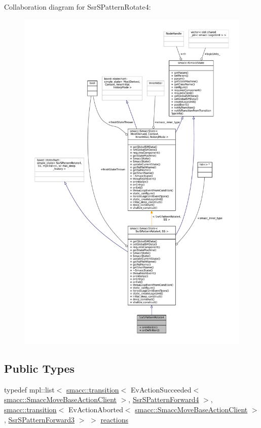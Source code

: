Collaboration diagram for Ssr\+S\+Pattern\+Rotate4\+:
\nopagebreak
\begin{figure}[H]
\begin{center}
\leavevmode
\includegraphics[width=350pt]{structSsrSPatternRotate4__coll__graph}
\end{center}
\end{figure}
\subsection*{Public Types}
\begin{DoxyCompactItemize}
\item 
typedef mpl\+::list$<$ \hyperlink{classsmacc_1_1transition}{smacc\+::transition}$<$ Ev\+Action\+Succeeded$<$ \hyperlink{classsmacc_1_1SmaccMoveBaseActionClient}{smacc\+::\+Smacc\+Move\+Base\+Action\+Client} $>$, \hyperlink{structSsrSPatternForward4}{Ssr\+S\+Pattern\+Forward4} $>$, \hyperlink{classsmacc_1_1transition}{smacc\+::transition}$<$ Ev\+Action\+Aborted$<$ \hyperlink{classsmacc_1_1SmaccMoveBaseActionClient}{smacc\+::\+Smacc\+Move\+Base\+Action\+Client} $>$, \hyperlink{structSsrSPatternForward3}{Ssr\+S\+Pattern\+Forward3} $>$ $>$ \hyperlink{structSsrSPatternRotate4_a876753525a2db93f305ce372622413a3}{reactions}
\end{DoxyCompactItemize}

